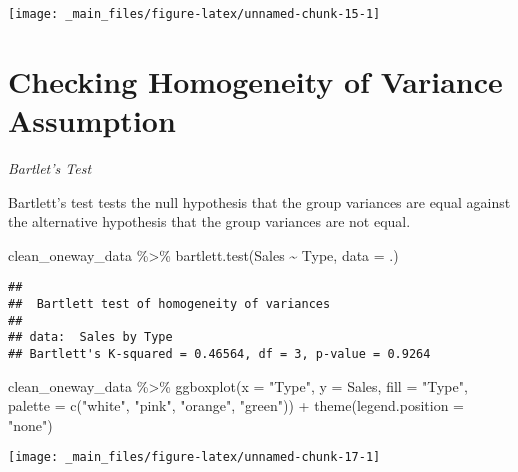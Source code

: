 \documentclass[
]{book}
\newenvironment{Shaded}{\begin{snugshade}}{\end{snugshade}}
\newcommand{\AttributeTok}[1]{\textcolor[rgb]{0.77,0.63,0.00}{#1}}
\newcommand{\FunctionTok}[1]{\textcolor[rgb]{0.00,0.00,0.00}{#1}}
\newcommand{\NormalTok}[1]{#1}
\newcommand{\SpecialCharTok}[1]{\textcolor[rgb]{0.00,0.00,0.00}{#1}}
\newcommand{\StringTok}[1]{\textcolor[rgb]{0.31,0.60,0.02}{#1}}
\begin{document}
\begin{center}\texttt{[image: \_main\_files/figure-latex/unnamed-chunk-15-1]} \end{center}

\hypertarget{checking-homogeneity-of-variance-assumption}{%
\section{Checking Homogeneity of Variance Assumption}\label{checking-homogeneity-of-variance-assumption}}

\emph{Bartlet's Test}

Bartlett's test tests the null hypothesis that the group variances are equal against the alternative hypothesis that the group variances are not equal.

\begin{Shaded}
\begin{Highlighting}[]
\NormalTok{clean\_oneway\_data }\SpecialCharTok{\%\textgreater{}\%} 
  \FunctionTok{bartlett.test}\NormalTok{(Sales }\SpecialCharTok{\textasciitilde{}}\NormalTok{ Type, }\AttributeTok{data =}\NormalTok{ .)}
\end{Highlighting}
\end{Shaded}

\begin{verbatim}
## 
##  Bartlett test of homogeneity of variances
## 
## data:  Sales by Type
## Bartlett's K-squared = 0.46564, df = 3, p-value = 0.9264
\end{verbatim}

\begin{Shaded}
\begin{Highlighting}[]
\NormalTok{clean\_oneway\_data }\SpecialCharTok{\%\textgreater{}\%} 
  \FunctionTok{ggboxplot}\NormalTok{(}\AttributeTok{x =} \StringTok{"Type"}\NormalTok{, }\AttributeTok{y =} \StringTok{\textquotesingle{}Sales\textquotesingle{}}\NormalTok{,}
            \AttributeTok{fill =} \StringTok{"Type"}\NormalTok{,}
            \AttributeTok{palette =} \FunctionTok{c}\NormalTok{(}\StringTok{"white"}\NormalTok{, }\StringTok{"pink"}\NormalTok{, }\StringTok{"orange"}\NormalTok{, }\StringTok{"green"}\NormalTok{)) }\SpecialCharTok{+} 
  \FunctionTok{theme}\NormalTok{(}\AttributeTok{legend.position =} \StringTok{"none"}\NormalTok{)}
\end{Highlighting}
\end{Shaded}

\begin{center}\texttt{[image: \_main\_files/figure-latex/unnamed-chunk-17-1]} \end{center}
\end{document}
